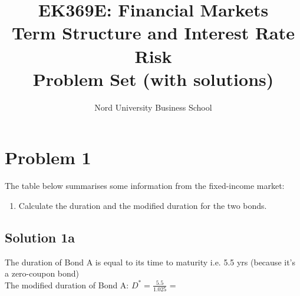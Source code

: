 \documentclass[12]{article}
\title{EK369E: Financial Markets\\ Term Structure and Interest Rate Risk\\ Problem Set (with solutions)}
\author{Nord University Business School}
\date{}
\begin{document}
\maketitle



\section*{Problem 1}
The table below summarises some information from the fixed-income market:
\begin{table}[H]
\centering
{}
\label{tab:my-table}
\end{table}

\begin{enumerate}
    \item[a)] Calculate the duration and the modified duration for the two bonds.
\end{enumerate}


\color{blue}
\subsection*{Solution 1a}
The duration of Bond A is equal to its time to maturity i.e. 5.5 yrs (because it's a zero-coupon bond)\\
The modified duration of Bond A: $D^* = ${\Large $\frac{5.5}{1.025}$} = \\
\end{document}
